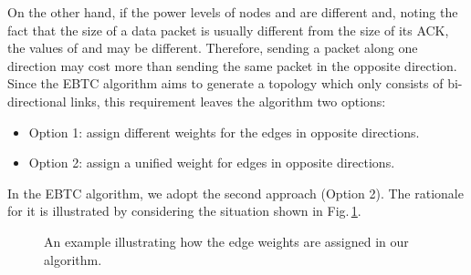 \documentclass[journal,12pt,onecolumn]{IEEEtran}
\begin{document}
On the other hand, if the power levels of nodes  and  are
different and, noting the fact that the size of a data packet is
usually different from the size of its ACK, the values of 
and  may be different. Therefore, sending a
packet along one direction may cost more than sending the same
packet in the opposite direction. Since the EBTC algorithm
aims to generate a topology which only consists of bi-directional
links, this requirement leaves the algorithm two options:
\begin{itemize}
\item Option 1: assign different weights for the edges in opposite directions.
\item Option 2: assign a unified weight for edges in opposite directions.
\end{itemize}

In the EBTC algorithm, we adopt the second approach (Option 2). The
rationale for it is illustrated by considering the situation shown in
Fig.\,\ref{fig:WeightAssignment}.


\begin{figure}[!t]
\begin{center}
    \hskip0.1in
    \hskip0.6in
     \hskip0.1in
     \hskip0.1in
    \hskip0.1in
   \caption{An example illustrating how the edge weights are assigned in our algorithm.}\label{fig:WeightAssignment}
\end{center}
\vspace{-20pt}
\end{figure}
\end{document}
